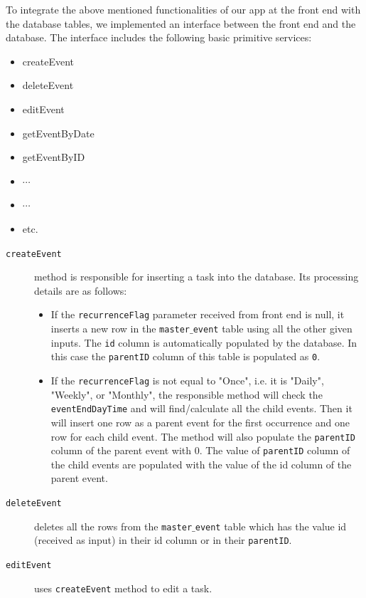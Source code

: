 \documentclass[10pt,a4paper]{report}
\begin{document}
   To integrate the above mentioned functionalities of our app at the front end with the database tables, we implemented an interface between the front end and the database. The interface includes the following basic primitive services:
   \begin{itemize}
   	  \item createEvent
      \item deleteEvent
      \item editEvent
      \item getEventByDate
      \item getEventByID
      \item $\cdots$
      \item $\cdots$
      \item etc.
   \end{itemize}
  \begin{description}
  
   
  \item[\texttt{createEvent}] method is responsible for inserting a task into the database. Its processing details are as follows: 
   
   \begin{itemize}
     \item  If the \texttt{recurrenceFlag} parameter received from front end is null, it inserts a new row in the \texttt{master$\_$event} table using all the other given inputs. The \texttt{id} column is automatically populated by the database. In this case the \texttt{parentID} column of this table is populated as \texttt{0}.

\item If the \texttt{recurrenceFlag} is not equal to "Once", i.e. it is "Daily", "Weekly", or "Monthly", the responsible method will check the \texttt{eventEndDayTime} and will find/calculate all the child events. Then it will insert one row as a parent event for the first occurrence and one row for each child event.
The method will also populate the \texttt{parentID} column of the parent event with 0. The value of \texttt{parentID} column of the child events are populated with the value of the id column of the parent event.
   \end{itemize}
   
 \item[\texttt{deleteEvent}] deletes all the rows from the \texttt{master$\_$event} table which has the value id (received as input) in their id column or in their \texttt{parentID}.   
   
    \item[\texttt{editEvent}] uses \texttt{createEvent} method to edit a task. 
  \begin{itemize}
   

\end{itemize}
\end{description}
\end{document}

